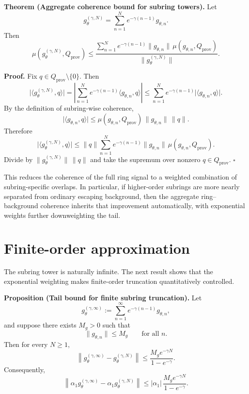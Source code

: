 \documentclass[10pt,letterpaper,twocolumn]{article}
\begin{document}
\par\smallskip\noindent\textbf{Theorem (Aggregate coherence bound for subring towers).} Let
\[
g_\theta^{(\gamma,N)} = \sum_{n=1}^{N} e^{-\gamma(n-1)} g_{\theta,n}.
\]
Then
\[
\mu\!\left(g_\theta^{(\gamma,N)},Q_{\mathrm{prov}}\right)
\le
\frac{\sum_{n=1}^{N} e^{-\gamma(n-1)}\|g_{\theta,n}\|\,\mu(g_{\theta,n},Q_{\mathrm{prov}})}{\|g_\theta^{(\gamma,N)}\|}.
\]

\par\smallskip\noindent\textbf{Proof.} Fix $q\in Q_{\mathrm{prov}}\setminus\{0\}$. Then
\[
\bigl|\langle g_\theta^{(\gamma,N)},q\rangle\bigr|
=
\left|\sum_{n=1}^{N} e^{-\gamma(n-1)}\langle g_{\theta,n},q\rangle\right|
\le
\sum_{n=1}^{N} e^{-\gamma(n-1)} \bigl|\langle g_{\theta,n},q\rangle\bigr|.
\]
By the definition of subring-wise coherence,
\[
\bigl|\langle g_{\theta,n},q\rangle\bigr|
\le
\mu(g_{\theta,n},Q_{\mathrm{prov}})\,\|g_{\theta,n}\|\,\|q\|.
\]
Therefore
\[
\bigl|\langle g_\theta^{(\gamma,N)},q\rangle\bigr|
\le
\|q\|\sum_{n=1}^{N} e^{-\gamma(n-1)}\|g_{\theta,n}\|\,\mu(g_{\theta,n},Q_{\mathrm{prov}}).
\]
Divide by $\|g_\theta^{(\gamma,N)}\|\,\|q\|$ and take the supremum over nonzero $q\in Q_{\mathrm{prov}}$.
\hfill$\square$

This reduces the coherence of the full ring signal to a weighted combination of subring-specific overlaps. In particular, if higher-order subrings are more nearly separated from ordinary escaping background, then the aggregate ring--background coherence inherits that improvement automatically, with exponential weights further downweighting the tail.

\section{Finite-order approximation}

The subring tower is naturally infinite. The next result shows that the exponential weighting makes finite-order truncation quantitatively controlled.

\par\smallskip\noindent\textbf{Proposition (Tail bound for finite subring truncation).} Let
\[
g_\theta^{(\gamma,\infty)} := \sum_{n=1}^{\infty} e^{-\gamma(n-1)} g_{\theta,n},
\]
and suppose there exists $M_g>0$ such that
\[
\|g_{\theta,n}\| \le M_g
\qquad \text{for all } n.
\]
Then for every $N\ge 1$,
\[
\left\|g_\theta^{(\gamma,\infty)} - g_\theta^{(\gamma,N)}\right\|
\le
\frac{M_g e^{-\gamma N}}{1-e^{-\gamma}}.
\]
Consequently,
\[
\left\|\alpha_1 g_\theta^{(\gamma,\infty)} - \alpha_1 g_\theta^{(\gamma,N)}\right\|
\le
|\alpha_1|\,\frac{M_g e^{-\gamma N}}{1-e^{-\gamma}}.
\]
\end{document}
